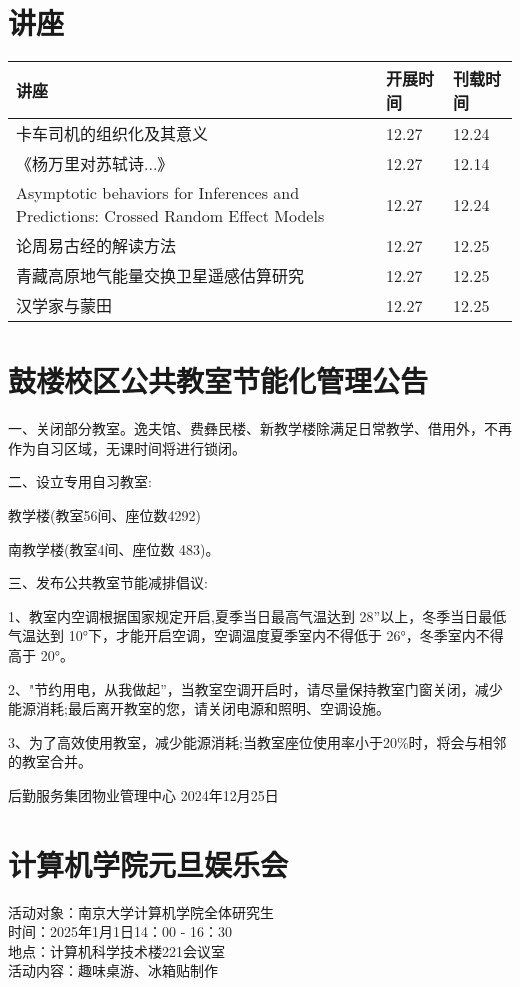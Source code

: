 \documentclass[letterpaper, 12pt]{article}
\begin{document}
\begin{multicols}{2}

\section{讲座}
\begin{tabularx}{0.5\textwidth}{|X|X|X|}
    \hline
    讲座 & 开展时间 & 刊载时间\\
    \hline\hline
卡车司机的组织化及其意义 & 12.27 & 12.24\\\hline
《杨万里对苏轼诗...》 & 12.27 & 12.14\\\hline
Asymptotic behaviors for Inferences and Predictions: Crossed Random Effect Models & 12.27 & 12.24\\\hline
论周易古经的解读方法 & 12.27 & 12.25\\\hline
青藏高原地气能量交换卫星遥感估算研究 & 12.27 & 12.25\\\hline
汉学家与蒙田 & 12.27 & 12.25\\\hline

\end{tabularx}


\section{鼓楼校区公共教室节能化管理公告}

一、关闭部分教室。逸夫馆、费彝民楼、新教学楼除满足日常教学、借用外，不再作为自习区域，无课时间将进行锁闭。

二、设立专用自习教室:

教学楼(教室56间、座位数4292)

南教学楼(教室4间、座位数 483)。

三、发布公共教室节能减排倡议:

1、教室内空调根据国家规定开启,夏季当日最高气温达到 28”以上，冬季当日最低气温达到 10°下，才能开启空调，空调温度夏季室内不得低于 26°，冬季室内不得高于 20°。

2、"节约用电，从我做起”，当教室空调开启时，请尽量保持教室门窗关闭，减少能源消耗;最后离开教室的您，请关闭电源和照明、空调设施。

3、为了高效使用教室，减少能源消耗;当教室座位使用率小于20\%时，将会与相邻的教室合并。

后勤服务集团物业管理中心
2024年12月25日
\section{计算机学院元旦娱乐会}
活动对象：南京大学计算机学院全体研究生\\
时间：2025年1月1日14：00 - 16：30\\
地点：计算机科学技术楼221会议室\\
活动内容：趣味桌游、冰箱贴制作\\

\end{multicols}
\end{document}

